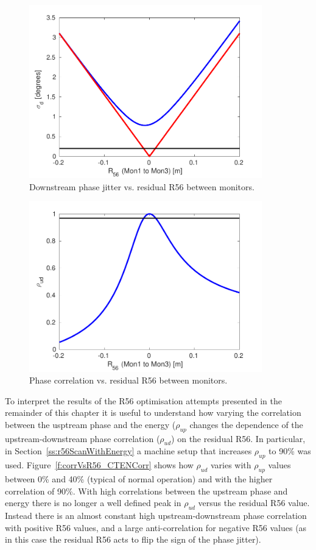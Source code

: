 \begin{figure}
  \centering
  \includegraphics[width=0.9\textwidth]{Figures/propagation/jitVsR56}
  \caption{Downstream phase jitter vs. residual R56 between monitors.}
  \label{f:jitVsR56}
\end{figure}

\begin{figure}
  \centering
  \includegraphics[width=0.9\textwidth]{Figures/propagation/corrVsR56}
  \caption{Phase correlation vs. residual R56 between monitors.}
  \label{f:corrVsR56}
\end{figure}

To interpret the results of the R56 optimisation attempts presented in the remainder of this chapter it is useful to understand how varying the correlation between the usptream phase and the energy (\(\rho_{up}\) changes the dependence of the upstream-downstream phase correlation (\(\rho_{ud}\)) on the residual R56. In particular, in Section~\ref{ss:r56ScanWithEnergy} a machine setup that increases \(\rho_{up}\) to 90\% was used. Figure~\ref{f:corrVsR56_CTENCorr} shows how \(\rho_{ud}\) varies with \(\rho_{up}\) values between 0\% and 40\% (typical of normal operation) and with the higher correlation of 90\%. With high correlations between the upstream phase and energy there is no longer a well defined peak in \(\rho_{ud}\) versus the residual R56 value. Instead there is an almost constant high upstream-downstream phase correlation with positive R56 values, and a large anti-correlation for negative R56 values (as in this case the residual R56 acts to flip the sign of the phase jitter). 

